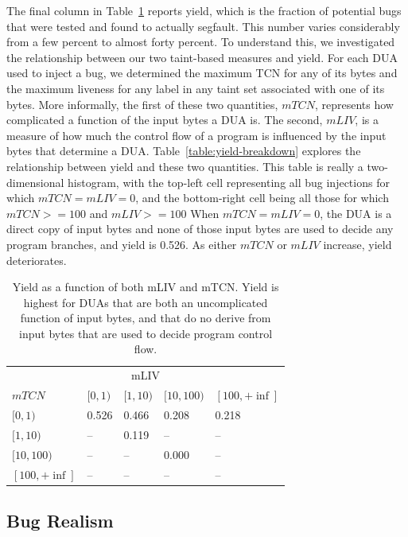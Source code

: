The final column in Table~\ref{table:open-source-targets} reports yield, which is the fraction of potential bugs that were tested and found to actually segfault.
This number varies considerably from a few percent to almost forty percent.
To understand this, we investigated the relationship between our two taint-based measures and yield.
For each DUA used to inject a bug, we determined the maximum TCN for any of its bytes and the maximum liveness for any label in any taint set associated with one of its bytes.  
More informally, the first of these two quantities, $mTCN$, represents how complicated a function of the input bytes a DUA is.
The second, $mLIV$, is a measure of how much the control flow of a program is influenced by the input bytes that determine a DUA.
Table~\ref{table:yield-breakdown} explores the relationship between yield and these two quantities. 
This table is really a two-dimensional histogram, with the top-left cell representing all bug injections for which $mTCN=mLIV=0$, and the bottom-right cell being all those for which $mTCN>=100$ and $mLIV>=100$
When $mTCN=mLIV=0$, the DUA is a direct copy of input bytes and none of those input bytes are used to decide any program branches, and yield is 0.526.
As either $mTCN$ or $mLIV$ increase, yield deteriorates.  

\begin{table}
\centering
\begin{tabular}{l|l|l|l|l} 
 & \multicolumn{3}{c}{mLIV} &  \\  
$mTCN$ &         $[0,1)$ & $[1,10)$ & $[10,100)$ & $[100,+\inf]$ \\  \hline 
$[0,1)$ &       0.526   & 0.466    & 0.208      & 0.218 \\
$[1,10)$ &      --      & 0.119    & --         & --    \\
$[10,100)$ &    --      & --       & 0.000      & --    \\
$[100,+\inf]$ & --      & --       & --         & -- \\ 
\end{tabular}
\caption{Yield as a function of both mLIV and mTCN.  
Yield is highest for DUAs that are both an uncomplicated function of input bytes, and that do no derive from input bytes that are used to decide program control flow.}
\label{table:open-source-targets}
\end{table}


\subsection{Bug Realism}

